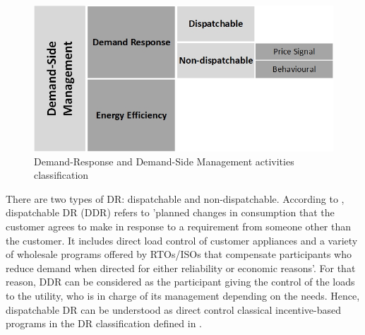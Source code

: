 \begin{figure}[]
	\centering
	\includegraphics[width=0.4\columnwidth ]{ChapterIntro/Figures/DRDSM_BW.jpg}
		\caption{Demand-Response and Demand-Side Management activities classification}  
\end{figure}

There are two types of DR: dispatchable and non-dispatchable. According to \cite{DNVGLEnergy2014}, dispatchable DR (DDR) refers to 'planned changes in consumption that the customer agrees to make in response to a requirement from someone other than the customer. It includes direct load control of customer appliances and a variety of wholesale programs offered by RTOs/ISOs that compensate participants who reduce demand when directed for either reliability or economic reasons'. For that reason, DDR can be considered as the participant giving
the control of the loads to the utility, who is in charge of its management depending on the needs. Hence, dispatchable DR can be understood as direct control classical incentive-based programs in the DR classification defined in \cite{albadi2008summary}.

